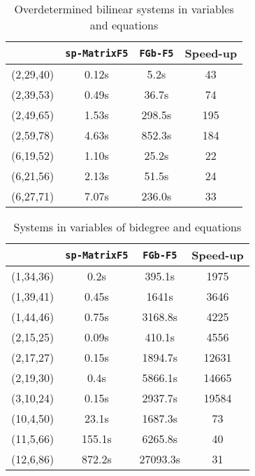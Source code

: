 \documentclass[12pt]{article}
\numberwithin{equation}{section}
\numberwithin{theorem}{section}
\begin{document}
\begin{table}
  \centering
  \begin{tabular}{|c||c|c||c|}
\hline
 & {\tt sp-MatrixF5} & {\tt FGb-F5} & Speed-up\\
\hline
\hline
(2,29,40) & 0.12s & 5.2s & 43 \\

(2,39,53) & 0.49s & 36.7s & 74 \\

(2,49,65) & 1.53s & 298.5s & 195\\

(2,59,78) & 4.63s & 852.3s & 184 \\

(6,19,52) & 1.10s & 25.2s & 22 \\

(6,21,56) & 2.13s & 51.5s & 24 \\

(6,27,71) & 7.07s & 236.0s & 33 \\
\hline
  \end{tabular}
  \caption{Overdetermined bilinear systems in  variables and  equations}\label{table:bilinear}
\end{table}

\begin{table}
  \centering
  \begin{tabular}{|c||c|c|c|}
\hline
 & {\tt sp-MatrixF5} & {\tt FGb-F5} &Speed-up \\
\hline
\hline
(1,34,36) & 0.2s & 395.1s & 1975 \\
(1,39,41) & 0.45s & 1641s & 3646 \\
(1,44,46) & 0.75s & 3168.8s & 4225 \\
(2,15,25) & 0.09s & 410.1s & 4556 \\
(2,17,27) & 0.15s & 1894.7s & 12631 \\
(2,19,30) & 0.4s & 5866.1s & 14665 \\
(3,10,24) & 0.15s & 2937.7s & 19584 \\
\hline
(10,4,50) & 23.1s & 1687.3s & 73 \\
(11,5,66) & 155.1s & 6265.8s & 40 \\
(12,6,86) & 872.2s & 27093.3s & 31 \\
\hline
 \end{tabular}
  \caption{Systems in  variables of bidegree  and  equations}\label{table:bidegree}
\end{table}
\end{document}
